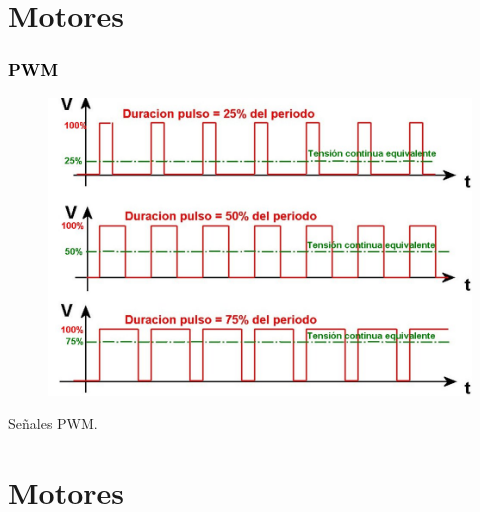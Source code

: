 \documentclass[xcolor=x11names,compress]{beamer}
\theoremstyle{cuadrado}
\begin{document}
\section{Motores}

\begin{frame}[fragile]
\frametitle{\textcolor{black}{ PWM }}

\begin{figure}%
    \centering
    \includegraphics[scale=0.18]{pwm.png}
\end{figure}

\begin{center}
Señales PWM.
\end{center}

\end{frame}


\section{Motores}
\end{document}
